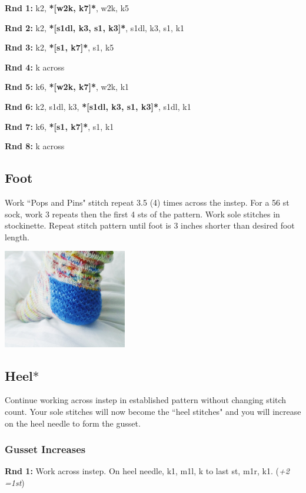 \documentclass[12pt]{article}
\newcommand{\rowDir}[1]{\textbf{#1:}} %
\renewcommand{\repeat}[1]{\textbf{*[#1]*}} %
\newcommand{\increase}[1]{(\emph{+#1 
	\ifnum#1=1{st}\else{sts}\fi})}
\newenvironment{unframed}
    {%
	\begin{addmargin}[2em]{0pt}
	\setlength{\parindent}{-2em}}
    {\vspace{1em}
	\setlength{\parindent}{0em}
	\end{addmargin}}
\begin{document}
\begin{multicols}{2}
\rowDir{Rnd 1} k2, \repeat{w2k, k7}, w2k, k5

\rowDir{Rnd 2} k2, \repeat{s1dl, k3, s1, k3}, s1dl, k3, s1, k1

\rowDir{Rnd 3} k2, \repeat{s1, k7}, s1, k5

\rowDir{Rnd 4} k across

\rowDir{Rnd 5} k6, \repeat{w2k, k7}, w2k, k1

\rowDir{Rnd 6} k2, s1dl, k3, \repeat{s1dl, k3, s1, k3}, s1dl, k1

\rowDir{Rnd 7} k6, \repeat{s1, k7}, s1, k1

\rowDir{Rnd 8} k across

\normalsize
\subsection*{Foot}

Work ``Pops and Pins" stitch repeat 3.5 (4) times across the instep. For a 56 st sock, work 3 repeats then the first 4 sts of the pattern. Work sole stitches in stockinette. Repeat stitch pattern until foot is 3 inches shorter than desired foot length.

\vspace{-1em}
\begin{flushright}
\includegraphics[height=1.7in]{heel.jpg}
\end{flushright}

\vspace{-4em}

\subsection*{Heel$*$}
Continue working across instep in established pattern without changing stitch count. Your sole stitches will now become the ``heel stitches" and you will increase on the heel needle to form the gusset.
\vspace{-1em}
\subsubsection*{Gusset Increases}
\vspace{-0.5em}
\begin{unframed}
\hspace{-2em}\rowDir{Rnd 1} Work across instep. On heel needle, k1, m1l, k to last st, m1r, k1. \increase{2}


\end{unframed}
\end{multicols}
\end{document}
